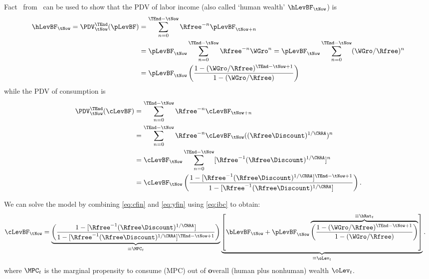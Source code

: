 Fact \FinSum~from \MathFactsList~can be used to show that the PDV of labor income (also called `human wealth'
$\hLevBF_{\tNow}$) is
\begin{equation}\begin{gathered}\begin{aligned}
        \hLevBF_{\tNow} = \PDV_{\tNow}^{\TEnd}(\pLevBF) & =  \sum_{n=0}^{\TEnd-\tNow} \Rfree^{-n}\pLevBF_{\tNow+n}
\\       & =  \pLevBF_{\tNow}\sum_{n=0}^{\TEnd-\tNow} \Rfree^{-n}{\WGro}^{n} = \pLevBF_{\tNow}\sum_{n=0}^{\TEnd-\tNow} ({\WGro}/\Rfree)^{n}
\\   & =  \pLevBF_{\tNow}\left(\frac{1-({\WGro}/\Rfree)^{\TEnd-\tNow+1}}{1-({\WGro}/\Rfree)}\right)    \label{eq:yfin}
\end{aligned}\end{gathered}\end{equation}
while the PDV of consumption is
\begin{equation}\begin{gathered}\begin{aligned}
        \PDV_{\tNow}^{\TEnd}(\cLevBF) & =  \sum_{n=0}^{\TEnd-\tNow} \Rfree^{-n}\cLevBF_{\tNow+n}
\\       & =  \sum_{n=0}^{\TEnd-\tNow} \Rfree^{-n}\cLevBF_{\tNow}((\Rfree\Discount)^{1/\CRRA})^{n}
\\       & =  \cLevBF_{\tNow} \sum_{n=0}^{\TEnd-\tNow} [\Rfree^{-1}(\Rfree\Discount)^{1/\CRRA}]^{n}
\\   & =  \cLevBF_{\tNow}\left(\frac{1-[\Rfree^{-1}(\Rfree\Discount)^{1/\CRRA}]^{\TEnd-\tNow+1}}{1-[\Rfree^{-1}(\Rfree\Discount)^{1/\CRRA}]}\right) \label{eq:cfin}.
\end{aligned}\end{gathered}\end{equation}

\hypertarget{cFuncAnalytical}{}
We can solve the model by combining \eqref{eq:cfin} and \eqref{eq:yfin} using
\eqref{eq:ibc} to obtain:
\begin{equation}\begin{gathered}\begin{aligned}
        \cLevBF_{\tNow} & =  \underbrace{\left(\frac{1-[\Rfree^{-1}(\Rfree\Discount)^{1/\CRRA}]}{1-[\Rfree^{-1}(\Rfree\Discount)^{1/\CRRA}]^{\TEnd-\tNow+1}}\right)}_{\equiv \MPC_{t}} \underbrace{\left[\bLevBF_{\tNow}+\pLevBF_{\tNow}\overbrace{\left(\frac{1-({\WGro}/\Rfree)^{\TEnd-\tNow+1}}{1-({\WGro}/\Rfree)}\right)}^{\equiv \hRat_{t}}\right]}_{\equiv \oLev_{t}} \label{eq:cfinhoriz}.
\end{aligned}\end{gathered}\end{equation}
where $\MPC_{t}$ is the marginal propensity to consume (MPC) out of \textbf{o}verall (human plus nonhuman) wealth $\oLev_{t}$.

